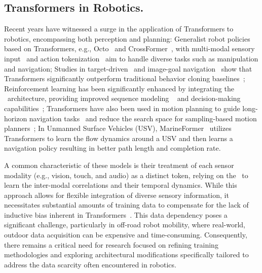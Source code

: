 \subsection{Transformers in Robotics.}
Recent years have witnessed a surge in the application of Transformers to robotics, encompassing both perception and planning: 
Generalist robot policies based on Transformers, e.g., Octo~\cite{octomodelteam2024octo} and CrossFormer~\cite{doshi2024scaling}, with multi-modal sensory input~\cite{jones2025sight} and action tokenization~\cite{pertsch2025fast} aim to handle diverse tasks such as manipulation and navigation;
Studies in target-driven~\cite{du2021vtnet, wang2024navformer, nazeri2024vanp, huang2024goalguided} and image-goal navigation~\cite{pelluri2024transformers, liu2024citywalker} show that Transformers significantly outperform traditional behavior cloning baselines~\cite{pomerleau1988alvinn, bojarski2016end, nazeri2021exploring}; 
Reinforcement learning has been significantly enhanced by integrating the \tr~architecture, providing improved sequence modeling ~\cite{zhang2024naviformer} and decision-making capabilities~\cite{chen2021decision};  
Transformers have also been used in motion planning to guide long-horizon navigation tasks~\cite{lawson2023control} and reduce the search space for sampling-based motion planners~\cite{johnson2022motion};
In Unmanned Surface Vehicles (USV), MarineFormer~\cite{kazemi2024marineformer} utilizes Transformers to learn the flow dynamics around a USV and then learns a navigation policy resulting in better path length and completion rate.

A common characteristic of these models is their treatment of each sensor modality (e.g., vision, touch, and audio) as a distinct token, relying on the \tr~to learn the inter-modal correlations and their temporal dynamics. While this approach allows for flexible integration of diverse sensory information, it necessitates substantial amounts of training data to compensate for the lack of inductive bias inherent in Transformers~\cite{dosovitskiy2021image}. This data dependency poses a significant challenge, particularly in off-road robot mobility, where real-world, outdoor data acquisition can be expensive and time-consuming. Consequently, there remains a critical need for research focused on refining training methodologies and exploring architectural modifications specifically tailored to address the data scarcity often encountered in robotics.

